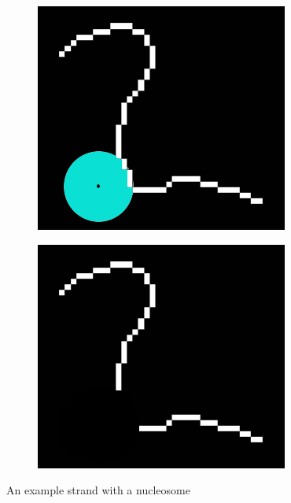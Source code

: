 \documentclass{article}
\begin{document}
\begin{figure}[H]
	\centering
	\begin{subfigure}[b]{0.34\textwidth}
		\includegraphics[width=\linewidth]{ghostbusters1}
		\caption{}
		\label{fig:partialLengthDenPhi1}
	\end{subfigure}
	\hspace{5mm}
	\begin{subfigure}[b]{0.34\textwidth}
		\includegraphics[width=\linewidth]{ghostbusters2}
		\caption{}
		\label{fig:partialLengthDenPhi2}
	\end{subfigure}
	\captionsetup{justification=centering}
	\caption{An example strand with a nucleosome}
	\label{fig:partialLengthDenPhi} %
\end{figure}
\newpage
\end{document}
